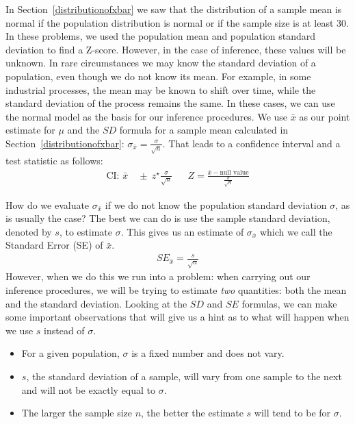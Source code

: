 In Section~\ref{distributionofxbar} we saw that the distribution of a sample mean is normal if the population distribution is normal or if the sample size is at least 30. In these problems, we used the population mean and population standard deviation to find a Z-score. However, in the case of inference, these values will be unknown. In rare circumstances we may know the standard deviation of a population, even though we do not know its mean. For example, in some industrial processes, the mean may be known to shift over time, while the standard deviation of the process remains the same. In these cases, we can use the normal model as the basis for our inference procedures. We use $\bar{x}$ as our point estimate for $\mu$ and the $SD$ formula for a sample mean calculated in Section~\ref{distributionofxbar}: $\sigma_{\bar{x}} =\frac{\sigma}{\sqrt{n}}$.  That leads to a confidence interval and a test statistic as follows:
\begin{align*}
\text{CI:  } \bar{x} &\ \pm \ z^{\star}\frac{\sigma}{\sqrt{n}}
&&Z = \frac{\bar{x} - \text{null value}}{\frac{\sigma}{\sqrt{n}}}
\end{align*}

How do we evaluate $\sigma_{\bar{x}}$ if we do not know the population standard deviation $\sigma$, as is usually the case?  The best we can do is use the sample standard deviation, denoted by $s$, to estimate $\sigma$.  This gives us an estimate of $\sigma_{\bar{x}}$ which we call the Standard Error (SE) of $\bar{x}$.
\begin{align*}
SE_{\bar{x}}= \frac{s}{\sqrt{n}}
\end{align*}
However, when we do this we run into a problem:  when carrying out our inference procedures, we will be trying to estimate \emph{two} quantities: both the mean and the standard deviation. Looking at the $SD$ and $SE$ formulas, we can make some important observations that will give us a hint as to what will happen when we use $s$ instead of $\sigma$.
\begin{itemize}
\setlength{\itemsep}{0mm}
\item For a given population, $\sigma$ is a fixed number and does not vary.
\item $s$, the standard deviation of a sample, will vary from one sample to the next and will not be exactly equal to $\sigma$.
\item The larger the sample size $n$, the better the estimate $s$ will tend to be for $\sigma$.
\end{itemize}

